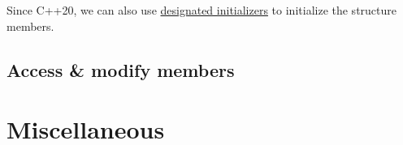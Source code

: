 \documentclass{article}
\begin{document}
Since C++20, we can also use \href{https://www.geeksforgeeks.org/designated-initializers-in-cpp-20/}{designated initializers} to initialize the structure members.


\subsection{Access \& modify members}



\section{Miscellaneous}


\printbibliography[heading=bibintoc]
	
\end{document}
